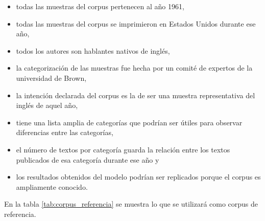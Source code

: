 \documentclass[12pt,letterpaper,twoside]{article}
\begin{document}
\begin{itemize}
\item todas las muestras del corpus pertenecen al año 1961,
\item todas las muestras del corpus se imprimieron en Estados Unidos durante ese año,
\item todos los autores son hablantes nativos de inglés,
\item la categorización de las muestras fue hecha por un comité de expertos de la universidad de Brown,
\item la intención declarada del corpus es la de ser una muestra representativa del inglés de aquel año,
\item tiene una lista amplia de categorías que podrían ser útiles para observar diferencias entre las categorías,
\item el número de textos por categoría guarda la relación entre los textos publicados de esa categoría durante ese año y
\item los resultados obtenidos del modelo podrían ser replicados porque el corpus es ampliamente conocido.
\end{itemize}

En la tabla \ref{tab:corpus_referencia} se muestra lo que se
utilizará como corpus de referencia.


\small
\end{document}
